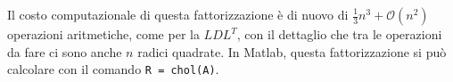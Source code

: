\documentclass[a4paper]{report}
\DeclarePairedDelimiter{\abs}{\lvert}{\rvert}
\theoremstyle{definiton}
\theoremstyle{remark}
\begin{document}
Il costo computazionale di questa fattorizzazione è di nuovo di $\frac13n^3 + \mathcal{O}(n^2)$ operazioni aritmetiche, come per la $LDL^T$, con il dettaglio che tra le operazioni da fare ci sono anche $n$ radici quadrate. In Matlab, questa fattorizzazione si può calcolare con il comando \lstinline{R = chol(A)}.










\end{document}
